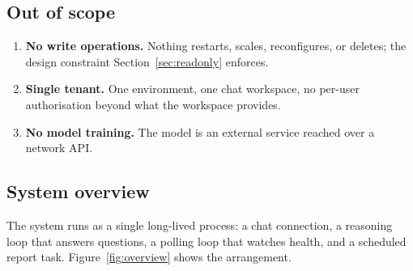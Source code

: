 \documentclass[11pt,a4paper]{article}
\begin{document}
\subsection{Out of scope}

\begin{enumerate}
  \item \textbf{No write operations.} Nothing restarts, scales, reconfigures, or
        deletes; the design constraint Section~\ref{sec:readonly} enforces.
  \item \textbf{Single tenant.} One environment, one chat workspace, no per-user
        authorisation beyond what the workspace provides.
  \item \textbf{No model training.} The model is an external service reached over
        a network API.
\end{enumerate}

\subsection{System overview}

The system runs as a single long-lived process: a chat connection, a reasoning loop
that answers questions, a polling loop that watches health, and a scheduled report
task. Figure~\ref{fig:overview} shows the arrangement.
\end{document}
